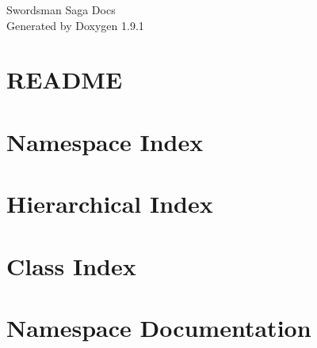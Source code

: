 \let\mypdfximage\pdfximage\def\pdfximage{\immediate\mypdfximage}\documentclass[twoside]{book}
\newcommand{\+}{\discretionary{\mbox{\scriptsize$\hookleftarrow$}}{}{}}
\newcommand{\clearemptydoublepage}{%
  \newpage{\pagestyle{empty}\cleardoublepage}%
}
\begin{document}
\raggedbottom

\hypersetup{pageanchor=false,
             bookmarksnumbered=true,
             pdfencoding=unicode
            }
\begin{titlepage}
\vspace*{7cm}
\begin{center}%
{\Large Swordsman Saga Docs }\\
\vspace*{1cm}
{\large Generated by Doxygen 1.9.1}\\
\end{center}
\end{titlepage}
\clearemptydoublepage
{}
\tableofcontents
\clearemptydoublepage
{}
\hypersetup{pageanchor=true}

\chapter{README}
\label{md_Engine_InputManagement_README}

\chapter{Namespace Index}

\chapter{Hierarchical Index}

\chapter{Class Index}

\chapter{Namespace Documentation}




















\end{document}
